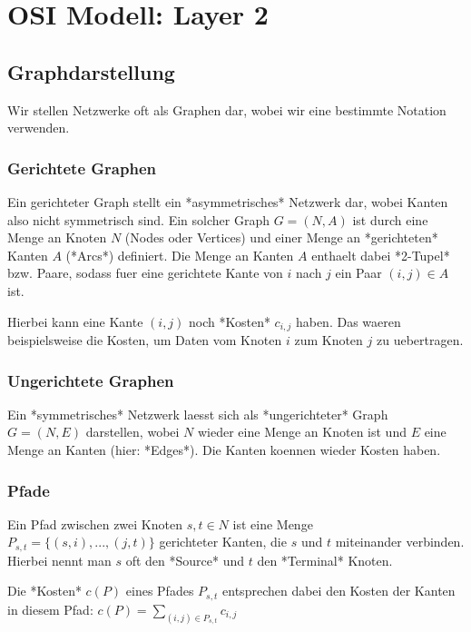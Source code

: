 \section{OSI Modell: Layer 2} 

\subsection{Graphdarstellung} 

Wir stellen Netzwerke oft als Graphen dar, wobei wir eine bestimmte Notation
verwenden.

\subsubsection{Gerichtete Graphen} 

Ein gerichteter Graph stellt ein *asymmetrisches* Netzwerk dar, wobei Kanten
also nicht symmetrisch sind. Ein solcher Graph $G = (N, A)$ ist durch eine Menge
an Knoten $N$ (Nodes oder Vertices) und einer Menge an *gerichteten* Kanten $A$
(*Arcs*) definiert. Die Menge an Kanten $A$ enthaelt dabei *2-Tupel* bzw. Paare,
sodass fuer eine gerichtete Kante von $i$ nach $j$ ein Paar $(i, j) \in A$ ist.

Hierbei kann eine Kante $(i, j)$ noch *Kosten* $c_{i,j}$ haben. Das waeren
beispielsweise die Kosten, um Daten vom Knoten $i$ zum Knoten $j$ zu uebertragen.

\subsubsection{Ungerichtete Graphen} 

Ein *symmetrisches* Netzwerk laesst sich als *ungerichteter* Graph $G = (N, E)$
darstellen, wobei $N$ wieder eine Menge an Knoten ist und $E$ eine Menge an
Kanten (hier: *Edges*). Die Kanten koennen wieder Kosten haben.

\subsubsection{Pfade} 

Ein Pfad zwischen zwei Knoten $s, t \in N$ ist eine Menge $P_{s,t} = \{(s, i),
..., (j, t)\}$ gerichteter Kanten, die $s$ und $t$ miteinander
verbinden. Hierbei nennt man $s$ oft den *Source* und $t$ den *Terminal* Knoten.

Die *Kosten* $c(P)$ eines Pfades $P_{s,t}$ entsprechen dabei den Kosten der Kanten
in diesem Pfad: $c(P) = \sum_{(i,j) \in P_{s,t}} c_{i,j}$

